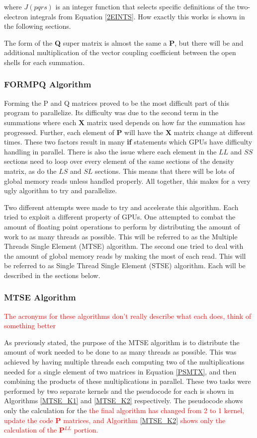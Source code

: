 \documentclass[12pt]{report}
\newcommand{\notetodylan}[1]{\textcolor{red}{#1}} %
\begin{document}
where $J(pqrs)$ is an integer function that selects specific definitions of the two-electron integrals from Equation \ref{2EINTS}. How exactly this works is shown in the following sections.

The form of the \textbf{Q} super matrix is almost the same a \textbf{P}, but there will be and additional multiplication of the vector coupling coefficient between the open shells for each summation.

\subsubsection{FORMPQ Algorithm}
Forming the P and Q matrices proved to be the most difficult part of this program to parallelize. Its difficulty was due to the second term in the summations where each \textbf{X} matrix used depends on how far the summation has progressed. Further, each element of \textbf{P} will have the \textbf{X} matrix change at different times. These two factors result in many \textbf{if} statements which GPUs have difficulty handling in parallel. There is also the issue where each element in the $LL$ and $SS$ sections need to loop over every element of the same sections of the density matrix, as do the $LS$ and $SL$ sections. This means that there will be lots of global memory reads unless handled properly. All together, this makes for a very ugly algorithm to try and parallelize.

Two different attempts were made to try and accelerate this algorithm. Each tried to exploit a different property of GPUs. One attempted to combat the amount of floating point operations to perform by distributing the amount of work to as many threads as possible. This will be referred to as the Multiple Threads Single Element (MTSE) algorithm. The second one tried to deal with the amount of global memory reads by making the most of each read. This will be referred to as Single Thread Single Element (STSE) algorithm. Each will be described in the sections below.

\subsubsection{MTSE Algorithm}
\notetodylan{The acronyms for these algorithms don't really describe what each does, think of something better}

As previously stated, the purpose of the MTSE algorithm is to distribute the amount of work needed to be done to as many threads as possible. This was achieved by having multiple threads each computing two of the multiplications needed for a single element of two matrices in Equation \ref{PSMTX}, and then combining the products of these multiplications in parallel. These two tasks were performed by two separate kernels and the pseudocode for each is shown in Algorithms \ref{MTSE_K1} and \ref{MTSE_K2} respectively. The pseudocode shows only the calculation for the \notetodylan{the final algorithm has changed from 2 to 1 kernel, update the code  \textbf{P} matrices, and Algorithm \ref{MTSE_K2} shows only the calculation of the \textbf{P$^{LL}$} portion.} 
\end{document}
